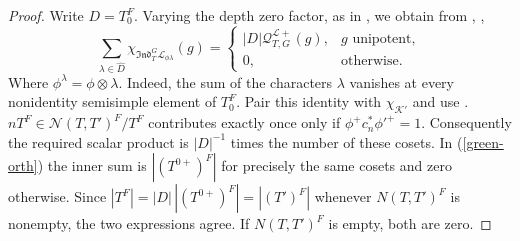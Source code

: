 \documentclass[11pt,letterpaper]{amsart}
\theoremstyle{definition}
\numberwithin{equation}{section}
\numberwithin{theorem}{section}
\begin{document}
\begin{proof}
Write $D=T_0^F$. Varying the depth zero factor, as in
\cite[\S9.6]{Lus_Ch2}, we obtain from , , 
\[
 \sum_{\lambda\in\widehat D}
 \chi_{\mathfrak{Ind}_T^G\mathcal L_{\phi\lambda}}(g)
 =\begin{cases}
 |D|\mathcal Q_{T,G}^{\mathcal L+}(g),&g\text{ unipotent},\\
 0,&\text{otherwise}.
 \end{cases}
\]
Where $\phi^\lambda=\phi\otimes \lambda$. Indeed, the sum of the characters $\lambda$ vanishes at every
nonidentity semisimple element of $T_0^F$. Pair this identity with
$\chi_{\mathcal K'}$ and use .
$nT^F\in\mathcal N(T,T')^F/T^F$ contributes exactly once only if
$\phi^+c_n^*\phi'^+=1$.
Consequently the required scalar product is $|D|^{-1}$ times the
number of these cosets. In (\ref{green-orth}) the inner sum is
$|(T^{0+})^F|$ for precisely the same cosets and zero otherwise.
Since $|T^F|=|D|\,|(T^{0+})^F|=|(T')^F|$ whenever $N(T,T')^F$ is nonempty, the two expressions agree. If
$N(T,T')^F$ is empty, both are zero.
\end{proof}
\end{document}
